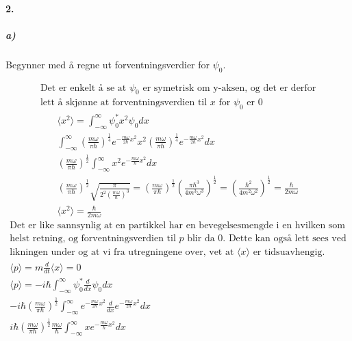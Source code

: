 \documentclass[11pt, A4paper,norsk]{article}
\begin{document}
		\paragraph{2.}
			\subparagraph{a)}
				\begin{flushleft}
Begynner med å regne ut forventningsverdier for $\psi_0$.
				\end{flushleft}
				\begin{gather*}
\text{Det er enkelt å se at $\psi_0$ er symetrisk om y-aksen, og det er derfor} \\
\text{lett å skjønne at forventningsverdien til $x$ for $\psi_0$ er $0$}
				\end{gather*}
				\begin{gather*}
\langle x^2 \rangle = \int_{- \infty}^{\infty} \psi_0^{*} x^2 \psi_0 dx \\
\int_{- \infty}^{\infty} \left( \frac{m \omega}{\pi \hbar} \right)^{\frac{1}{4}} e^{- \frac{m \omega}{2 \hbar} x^2} x^2 \left( \frac{m \omega}{\pi \hbar} \right)^{\frac{1}{4}} e^{- \frac{m \omega}{2 \hbar} x^2} dx \\
\left( \frac{m \omega}{\pi \hbar} \right)^{\frac{1}{2}} \int_{- \infty}^{\infty} x^2 e^{- \frac{m \omega}{\hbar} x^2} dx \\
\left( \frac{m \omega}{\pi \hbar} \right)^{\frac{1}{2}} \sqrt{\frac{\pi}{2^2 \left( \frac{m \omega}{\hbar} \right)^{3}}} = \left( \frac{m \omega}{\pi \hbar} \right)^{\frac{1}{2}} \left( \frac{\pi \hbar^3}{4 m^3 \omega^3} \right)^{\frac{1}{2}} = \left( \frac{\hbar^2}{4 m^2 \omega^2} \right)^{\frac{1}{2}} = \frac{\hbar}{2 m \omega} \\
\langle x^2 \rangle = \frac{\hbar}{2 m \omega}
				\end{gather*}
				\begin{gather*}
\text{Det er like sannsynlig at en partikkel har en bevegelsesmengde i en hvilken som} \\
\text{helst retning, og forventningsverdien til $p$ blir da $0$. Dette kan også lett sees ved} \\
\text{likningen under og at vi fra utregningene over, vet at $\langle x \rangle$ er tidsuavhengig.} \\
\langle p \rangle = m \frac{d}{dt} \langle x \rangle = 0 \\
\langle p \rangle = - i \hbar \int_{- \infty}^{\infty} \psi_0^{*} \frac{d}{dx} \psi_0 dx \\
- i \hbar \left( \frac{m \omega}{\pi \hbar} \right)^{\frac{1}{2}} \int_{- \infty}^{\infty} e^{- \frac{m \omega}{2 \hbar} x^2} \frac{d}{dx} e^{- \frac{m \omega}{2 \hbar} x^2} dx \\
i \hbar \left( \frac{m \omega}{\pi \hbar} \right)^{\frac{1}{2}} \frac{m \omega}{\hbar} \int_{- \infty}^{\infty} x e^{- \frac{m \omega}{\hbar} x^2} dx \\
				\end{gather*}
\end{document}
